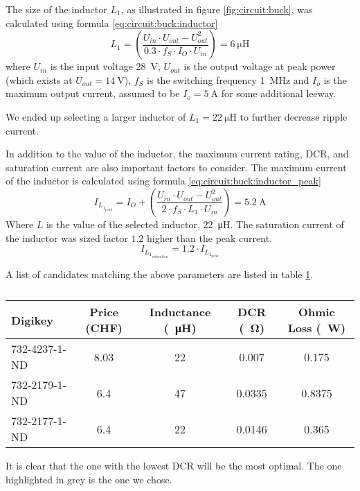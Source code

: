 The size of the inductor $L_1$, as illustrated in figure \ref{fig:circuit:buck},
was calculated using formula \ref{eq:circuit:buck:inductor}
\begin{equation}
    L_1 = \left( \frac{U_{in} \cdot U_{out} - U_{out}^2}{0.3 \cdot f_S \cdot I_O \cdot U_{in}} \right) = \SI{6}{\micro\henry}
    \label{eq:circuit:buck:inductor}
\end{equation}
where $U_{in}$ is the  input  voltage  \SI{28}{\volt},  $U_{out}$  is the output
voltage at peak power (which exists at $U_{out} = \SI{14}{\volt}$), $f_S$ is the
switching frequency \SI{1}{\mega\hertz} and $I_o$ is the maximum output current,
assumed   to   be   $I_o  =  \SI{5}{\ampere}$  for   some   additional   leeway.

We ended up selecting a  larger  inductor  of  $L_1  = \SI{22}{\micro\henry}$ to
further decrease ripple current.

In addition to the value of  the  inductor, the maximum current rating, DCR, and
saturation  current are also important factors to consider. The maximum  current
of the inductor is calculated using formula 
\ref{eq:circuit:buck:inductor_peak}
\begin{equation}
    I_{L_{1_{peak}}} = I_O + \left( \frac{U_{in} \cdot U_{out} - U_{out}^2}{2 \cdot f_S \cdot L_1 \cdot U_{in}} \right) = \SI{5.2}{\ampere}
    \label{eq:circuit:buck:inductor_peak}
\end{equation}
Where $L$  is  the  value  of  the selected inductor, \SI{22}{\micro\henry}. The
saturation  current  of the inductor was sized factor $1.2$ higher than the peak
current.
\begin{equation}
    I_{L_{1_{saturation}}} = 1.2 \cdot I_{L_{1_{peak}}}
    \label{eq:circuit:buck:inductor_saturation}
\end{equation}

A  list  of  candidates  matching  the  above  parameters  are  listed in  table
\ref{tab:circuit:buck:inductor}.

\begin{table}[th!]
    \begin{center}
        \caption{}
        \label{tab:circuit:buck:inductor}
        \begin{tabular}{lcccc}
            \toprule
            Digikey         & Price (CHF) & Inductance (\SI{}{\micro\henry}) & DCR (\SI{}{\ohm}) & Ohmic Loss (\SI{}{\watt}) \\
            \midrule
            \rowcolor{lightgray}
            732-4237-1-ND   & 8.03        & 22                               & 0.007             & 0.175  \\
            732-2179-1-ND   & 6.4         & 47                               & 0.0335            & 0.8375 \\
            732-2177-1-ND   & 6.4         & 22                               & 0.0146            & 0.365  \\
            \bottomrule
        \end{tabular}
    \end{center}
\end{table}

It  is  clear that the one with the lowest DCR will be the most optimal. The one
highlighted in grey is the one we chose.

